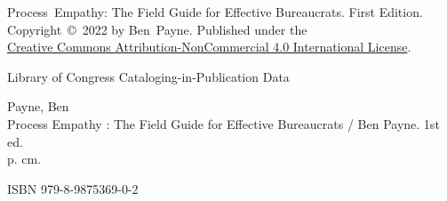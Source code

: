 \thispagestyle{empty}

\noindent Process~Empathy: The Field Guide for Effective Bureaucrats. First Edition. \\Copyright~\copyright~2022 by Ben~Payne. 
Published under the \\
\href{https://creativecommons.org/licenses/by-nc/4.0/}{Creative Commons Attribution-NonCommercial 4.0 International License}.


\vspace*{\fill}



\noindent Library of Congress Cataloging-in-Publication Data

\noindent Payne, Ben\\
Process Empathy : The Field Guide for Effective Bureaucrats / Ben Payne. 1st ed.\\
p. cm.

\noindent ISBN 979-8-9875369-0-2

